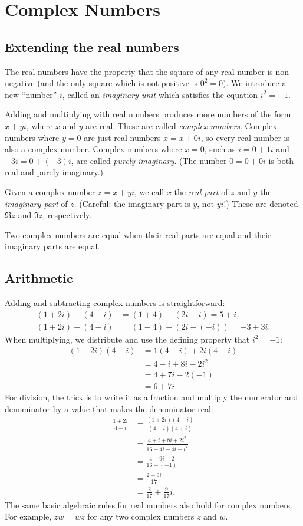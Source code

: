 \section{Complex Numbers}

\subsection{Extending the real numbers}

The real numbers have the property that the square of any real number is non-negative (and the only square which is not positive is $0^2 = 0$). We introduce a new ``number'' $i$, called an \emph{imaginary unit} which satisfies the equation $i^2 = -1$.

Adding and multiplying with real numbers produces more numbers of the form $x + yi$, where $x$ and $y$ are real. These are called \emph{complex numbers}. Complex numbers where $y = 0$ are just real numbers $x = x + 0i$, so every real number is also a complex number. Complex numbers where $x = 0$, such as $i = 0 + 1i$ and $-3i = 0 + (-3)i$, are called \emph{purely imaginary}. (The number $0 = 0 + 0i$ is both real and purely imaginary.)

Given a complex number $z = x + yi$, we call $x$ the \emph{real part} of $z$ and $y$ the \emph{imaginary part} of $z$. (Careful: the imaginary part is $y$, not $yi$!) These are denoted $\Re z$ and $\Im z$, respectively.

Two complex numbers are equal when their real parts are equal and their imaginary parts are equal.


\subsection{Arithmetic}

Adding and subtracting complex numbers is straightforward:
\begin{align}
(1 + 2i) + (4 - i) &= (1 + 4) + (2i - i) = 5 + i, \\
(1 + 2i) - (4 - i) &= (1 - 4) + (2i - (-i)) = -3 + 3i.
\end{align}
When multiplying, we distribute and use the defining property that $i^2 = -1$:
\begin{align}
(1 + 2i)(4 - i) &= 1(4 - i) + 2i(4 - i) \\
&= 4 - i + 8i - 2i^2 \\
&= 4 + 7i - 2(-1) \\
&= 6 + 7i. 
\end{align}
For division, the trick is to write it as a fraction and multiply the numerator and denominator by a value that makes the denominator real:
\begin{align}
\frac{1 + 2i}{4 - i} &= \frac{(1 + 2i)(4 + i)}{(4 - i)(4 + i)} \\
&= \frac{4 + i + 8i + 2i^2}{16 + 4i - 4i - i^2} \\
&= \frac{4 + 9i - 2}{16 - (-1)} \\
&= \frac{2 + 9i}{17} \\
&= \frac{2}{17} + \frac{9}{17}i.
\end{align}
The same basic algebraic rules for real numbers also hold for complex numbers. For example, $zw = wz$ for any two complex numbers $z$ and $w$.


